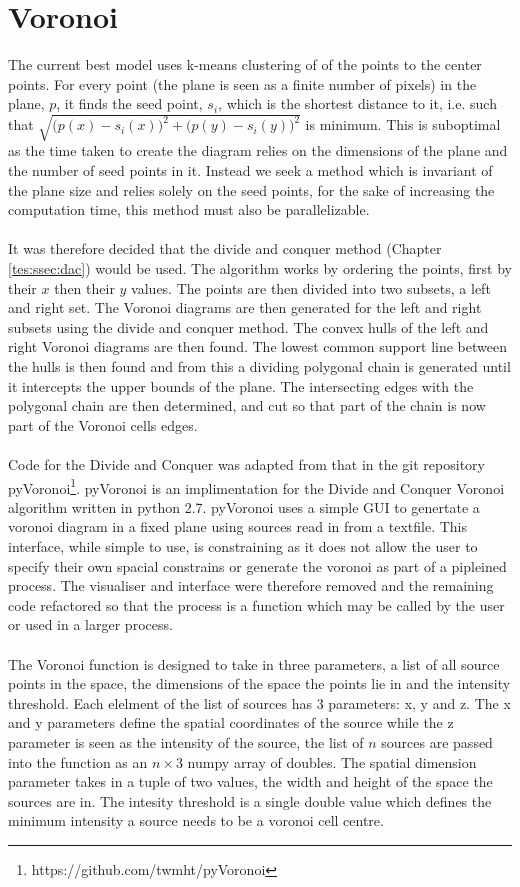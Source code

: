 \section{Voronoi}
The current best model uses k-means clustering of of the points to the center points. For every point (the plane is seen as a finite number of pixels) in the plane, $p$, it finds the seed point, $s_i$, which is the shortest distance to it, i.e. such that $\sqrt{\big(p(x)-s_i(x)\big)^2 + \big(p(y)-s_i(y)\big)^2}$ is minimum. This is suboptimal as the time taken to create the diagram relies on the dimensions of the plane and the number of seed points in it. Instead we seek a method which is invariant of the plane size and relies solely on the seed points, for the sake of increasing the computation time, this method must also be parallelizable. 
\\
\\
It was therefore decided that the divide and conquer method (Chapter \ref{tes:ssec:dac}) would be used. The algorithm works by ordering the points, first by their $x$ then their $y$ values. The points are then divided into two subsets, a left and right set. The Voronoi diagrams are then generated for the left and right subsets using the divide and conquer method. The convex hulls of the left and right Voronoi diagrams are then found. The lowest common support line between the hulls is then found and from this a dividing polygonal chain is generated until it intercepts the upper bounds of the plane. The intersecting edges with the polygonal chain are then determined, and cut so that part of the chain is now part of the Voronoi cells edges.
\\
\\
Code for the Divide and Conquer was adapted from that in the git repository pyVoronoi\footnote{https://github.com/twmht/pyVoronoi}. pyVoronoi is an implimentation for the Divide and Conquer Voronoi algorithm written in python 2.7. pyVoronoi uses a simple GUI to genertate a voronoi diagram in a fixed plane using sources read in from a textfile. This interface, while simple to use, is constraining as it does not allow the user to specify their own spacial constrains or generate the voronoi as part of a pipleined process. The visualiser and interface were therefore removed and the remaining code refactored so that the process is a function which may be called by the user or used in a larger process.
\\
\\
The Voronoi function is designed to take in three parameters, a list of all source points in the space, the dimensions of the space the points lie in and the intensity threshold. Each elelment of the list of sources has 3 parameters: x, y and z. The x and y parameters define the spatial coordinates of the source while the z parameter is seen as the intensity of the source, the list of $n$ sources are passed into the function as an $n \times 3$ numpy array of doubles. The spatial dimension parameter takes in a tuple of two values, the width and height of the space the sources are in. The intesity threshold is a single double value which defines the minimum intensity a source needs to be a voronoi cell centre.
